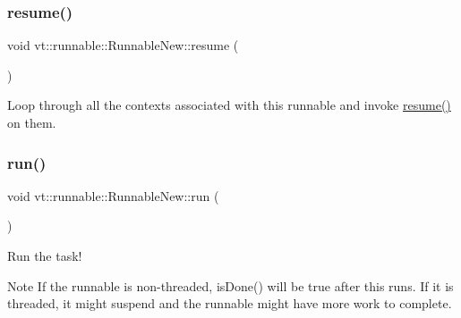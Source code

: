\mbox{\label{structvt_1_1runnable_1_1_runnable_new_a4d38f8f4d413457a40f134a57480449d}} 
\subsubsection{\texorpdfstring{resume()}{resume()}}
{\footnotesize\ttfamily void vt\+::runnable\+::\+Runnable\+New\+::resume (\begin{DoxyParamCaption}{ }\end{DoxyParamCaption})\hspace{0.3cm}{\ttfamily [private]}}



Loop through all the contexts associated with this runnable and invoke {\ttfamily \hyperlink{structvt_1_1runnable_1_1_runnable_new_a4d38f8f4d413457a40f134a57480449d}{resume()}} on them. 

\mbox{\label{structvt_1_1runnable_1_1_runnable_new_a3fa6c8ee2214c074c748000f782ad793}} 
\subsubsection{\texorpdfstring{run()}{run()}}
{\footnotesize\ttfamily void vt\+::runnable\+::\+Runnable\+New\+::run (\begin{DoxyParamCaption}{ }\end{DoxyParamCaption})}



Run the task! 

\begin{DoxyNote}{Note}
If the runnable is non-\/threaded, {\ttfamily is\+Done()} will be {\ttfamily true} after this runs. If it is threaded, it might suspend and the runnable might have more work to complete. 
\end{DoxyNote}
\mbox{\label{structvt_1_1runnable_1_1_runnable_new_acc279e407e94d28355b982f6c6adc67b}} 
